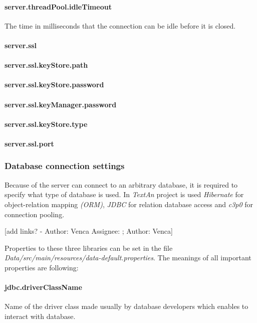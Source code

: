 \documentclass[12pt,a4paper]{report}
\makeatletter
\newcommand{\comment}[3][\@empty]{
  {\color{magenta}[#3 - }
  {\color{green}\ifx\@empty#1\relax Author: #2 \else Assignee: #1; Author: #2\fi}{\color{magenta}]}
}
\newcommand{\textan}{\emph{TextAn}}
\makeatother
\begin{document}
\paragraph{server.threadPool.idleTimeout} The time in milliseconds that the connection can be idle before it is closed.

\paragraph{server.ssl}
\paragraph{server.ssl.keyStore.path}
\paragraph{server.ssl.keyStore.password}
\paragraph{server.ssl.keyManager.password}
\paragraph{server.ssl.keyStore.type}
\paragraph{server.ssl.port}

\subsubsection{Database connection settings}

Because of the server can connect to an arbitrary database, it is required to specify what type of database is used.
In \textan{} project is used \emph{Hibernate} for object-relation mapping \emph{(ORM)}, \emph{JDBC} for relation database access and \emph{c3p0} for connection pooling.

\comment{Venca}{add links?}
Properties to these three libraries can be set in the file \emph{Data/src/main/resources/data-default.properties}. The meanings of all important properties are following:


\paragraph{jdbc.driverClassName}
Name of the driver class made usually by database developers which enables to interact with database.
\end{document}
